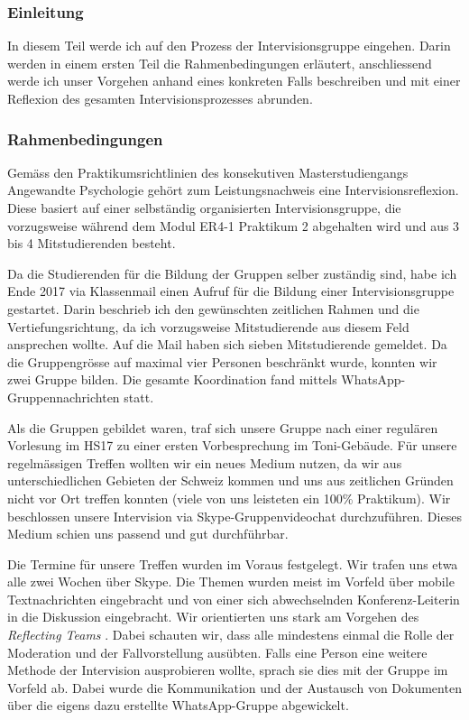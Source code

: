 \subsubsection{Einleitung}
In diesem Teil werde ich auf den Prozess der Intervisionsgruppe  eingehen. Darin werden in einem ersten Teil die Rahmenbedingungen erläutert, anschliessend werde ich unser Vorgehen anhand eines konkreten Falls beschreiben und mit einer Reflexion des gesamten Intervisionsprozesses abrunden. 

\subsubsection{Rahmenbedingungen}
Gemäss den Praktikumsrichtlinien des konsekutiven Masterstudiengangs Angewandte Psychologie gehört zum Leistungsnachweis eine Intervisionsreflexion. Diese basiert auf einer selbständig organisierten Intervisionsgruppe, die vorzugsweise während dem Modul ER4-1 Praktikum 2 abgehalten wird und aus 3 bis 4 Mitstudierenden besteht.

Da die Studierenden für die Bildung der Gruppen selber zuständig sind, habe ich Ende 2017 via Klassenmail einen Aufruf für die Bildung einer Intervisionsgruppe gestartet. Darin beschrieb ich den gewünschten zeitlichen Rahmen und die Vertiefungsrichtung, da ich vorzugsweise Mitstudierende aus diesem Feld ansprechen wollte. Auf die Mail haben sich sieben Mitstudierende gemeldet. Da die Gruppengrösse auf maximal vier Personen beschränkt wurde, konnten wir zwei Gruppe bilden. Die gesamte Koordination fand 
mittels WhatsApp-Gruppennachrichten statt.

Als die Gruppen gebildet waren, traf sich unsere Gruppe nach einer regulären Vorlesung im HS17 zu einer ersten Vorbesprechung im Toni-Gebäude. Für unsere regelmässigen Treffen wollten wir ein neues Medium nutzen, da wir aus unterschiedlichen Gebieten der Schweiz kommen und uns aus zeitlichen Gründen nicht vor Ort treffen konnten (viele von uns leisteten ein 100\% Praktikum). Wir beschlossen unsere Intervision via Skype-Gruppenvideochat durchzuführen. Dieses Medium schien uns passend und gut durchführbar. 

Die Termine für unsere Treffen wurden im Voraus festgelegt. Wir trafen uns etwa alle zwei Wochen über Skype. Die Themen wurden meist im Vorfeld über mobile Textnachrichten eingebracht und von einer sich abwechselnden Konferenz-Leiterin in die Diskussion eingebracht. Wir orientierten uns stark am Vorgehen des \textit{Reflecting Teams} \cite{ReflectingTeam2018}. Dabei schauten wir, dass alle mindestens einmal die Rolle der Moderation und der Fallvorstellung ausübten. Falls eine Person eine weitere Methode der Intervision ausprobieren wollte, sprach sie dies mit der Gruppe im Vorfeld ab. Dabei wurde die Kommunikation und der Austausch von Dokumenten über die eigens dazu erstellte WhatsApp-Gruppe abgewickelt.

